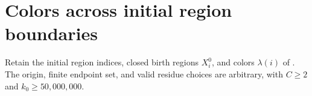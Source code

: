 \section{Colors across initial region boundaries}
\label{sec:area_law_initial_region_interfaces}

Retain the initial region indices, closed birth regions $X_i^0$, and
colors $\lambda(i)$ of \cite[Section~11]{OpenAI2026AreaLaw}. The origin,
finite endpoint set, and valid residue choices are arbitrary, with
$C\ge 2$ and $k_0\ge 50{,}000{,}000$.


